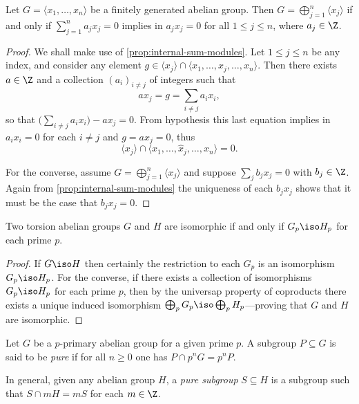 \begin{lemma}
\label{lem:grp-independence}
Let \(G = \langle x_1, \dots, x_n \rangle\) be a finitely generated abelian
group. Then \(G = \bigoplus_{j=1}^n \langle x_j \rangle\) if and only if
\(\sum_{j=1}^n a_j x_j = 0\) implies in \(a_j x_j = 0\) for all
\(1 \leq j \leq n\), where \(a_j \in \Z\).
\end{lemma}

\begin{proof}
We shall make use of \cref{prop:internal-sum-modules}. Let \(1 \leq j \leq n\)
be any index, and consider any element
\(g \in \langle x_j \rangle \cap \langle x_1, \dots, \widehat x_j, \dots, x_n
\rangle\). Then there exists \(a \in \Z\) and a collection \((a_i)_{i \neq j}\)
of integers such that
\[
a x_j = g = \sum_{i \neq j} a_i x_i,
\]
so that \(\big(\sum_{i \neq j} a_i x_i \big) - a x_j = 0\). From hypothesis this
last equation implies in \(a_i x_i = 0\) for each \(i \neq j\) and
\(g = a x_j = 0\), thus
\[
\langle x_j \rangle
\cap \langle x_1, \dots, \widehat x_j, \dots, x_n \rangle
= 0.
\]

For the converse, assume \(G = \bigoplus_{j=1}^n \langle x_j \rangle\) and
suppose \(\sum_j b_j x_j = 0\) with \(b_j \in \Z\). Again from
\cref{prop:internal-sum-modules} the uniqueness of each \(b_j x_j\) shows that
it must be the case that \(b_j x_j = 0\).
\end{proof}

\begin{proposition}
\label{prop:torsion-grp-iso-iff-primary-iso}
Two torsion abelian groups \(G\) and \(H\) are isomorphic if and only if
\(G_p \iso H_p\) for each prime \(p\).
\end{proposition}

\begin{proof}
If \(G \iso H\) then certainly the restriction to each \(G_p\) is an isomorphism
\(G_p \iso H_p\). For the converse, if there exists a collection of isomorphisms
\(G_p \iso H_p\) for each prime \(p\), then by the universap property of
coproducts there exists a unique induced isomorphism
\(\bigoplus_p G_p \iso \bigoplus_p H_p\)---proving that \(G\) and \(H\) are
isomorphic.
\end{proof}

\begin{definition}
\label{def:pure-subgroup}
Let \(G\) be a \(p\)-primary abelian group for a given prime \(p\). A subgroup
\(P \subseteq G\) is said to be \emph{pure} if for all \(n \geq 0\) one has
\(P \cap p^n G = p^n P\).

In general, given any abelian group \(H\), a \emph{pure subgroup}
\(S \subseteq H\) is a subgroup such that \(S \cap m H = m S\) for each
\(m \in \Z\).
\end{definition}

